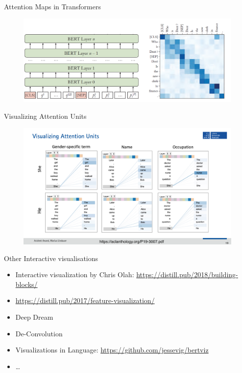 \documentclass[11pt,compress,t,notes=noshow, aspectratio=169, xcolor=table]{beamer}
\begin{document}
\begin{frame}{Attention Maps in Transformers}
\begin{figure}
    \centering
    \includegraphics[scale=.4]{bild13}
\end{figure}
    
\end{frame}

\begin{frame}{Visualizing Attention Units}
    \begin{figure}
        \includegraphics[scale=.45]{figure/iml-attention-vis.pdf}
    \end{figure}
\end{frame}

\begin{frame}{Other Interactive visualisations}
    \begin{itemize}
        \item Interactive visualization by Chris Olah: \url{https://distill.pub/2018/building-blocks/}
        \item \url{https://distill.pub/2017/feature-visualization/}
        \item Deep Dream
        \item De-Convolution
        \item Visualizations in Language: \url{https://github.com/jessevig/bertviz}
        \item \dots
    \end{itemize}
\end{frame}

\endlecture
\end{document}
